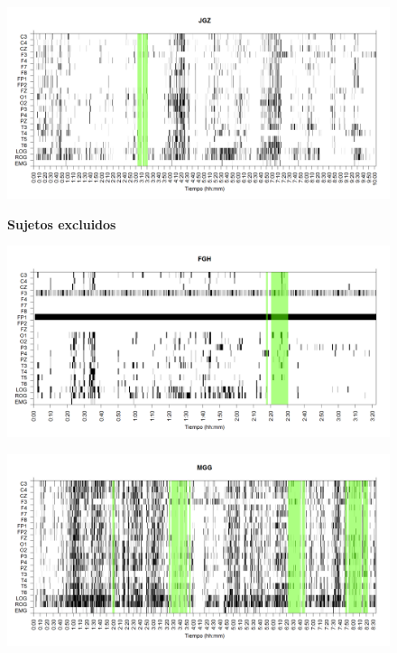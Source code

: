 \begin{figure}
\centering
\includegraphics[width=0.8\linewidth]
{./img_ejemplos/JGMN6SUE_est.png} 
\label{grf_JGZ}
\end{figure}


\begin{figure}
\Large{\textbf{Sujetos excluidos}}
\end{figure}

\begin{figure}
\centering
\includegraphics[width=0.8\linewidth]
{./img_ejemplos/FGHSUE_est.png} 
\label{grf_FGH}
\end{figure}

\begin{figure}
\centering
\includegraphics[width=0.8\linewidth]
{./img_ejemplos/MGNA5SUE_est.png} 
\label{grf_MGG}
\end{figure}

